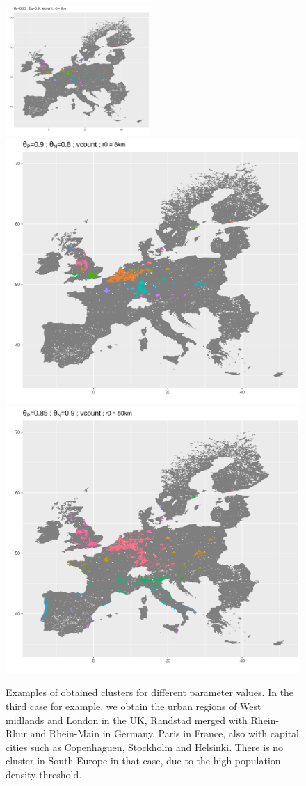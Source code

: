 \documentclass{jimis-en}
\begin{document}
\begin{figure}[ht] 
{\includegraphics[width=0.49\textwidth]{figures/totalPop4183694_00056402_ecount850_radius8000.png}}\\
  {\includegraphics[width=0.49\linewidth]{figures/totalPop2219780_36719597_vcount378_radius8000.png}}
  {\includegraphics[width=0.49\linewidth]{figures/totalPop1474347_36891685_vcount595_radius50000.png}}
  \centering
  
  \caption{Examples of obtained clusters for different parameter values. In the third case for example, we obtain the urban regions of West midlands and London in the UK, Randstad merged with Rhein-Rhur and Rhein-Main in Germany, Paris in France, also with capital cities such as Copenhaguen, Stockholm and Helsinki. There is no cluster in South Europe in that case, due to the high population density threshold.\label{fig:exclusters}}
\end{figure}
\end{document}

